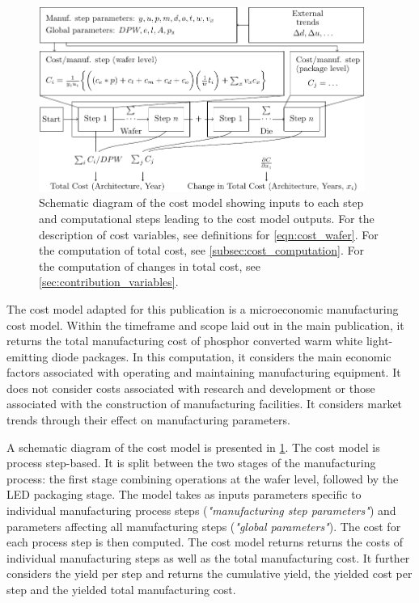 \documentclass[10pt]{article}
\begin{document}
\begin{figure}[h!]
    \centering
    \includegraphics[width=0.95\textwidth]{./figures/cost_model.pdf}
    \caption{Schematic diagram of the cost model showing inputs to each step and computational steps leading to the cost model outputs. For the description of cost variables, see definitions for \cref{eqn:cost_wafer}. For the computation of total cost, see \cref{subsec:cost_computation}. For the computation of changes in total cost, see \cref{sec:contribution_variables}.}
    \label{fig:costmodel-schematic}
\end{figure}

The cost model adapted for this publication is a microeconomic manufacturing cost model. Within the timeframe and scope laid out in the main publication, it returns the total manufacturing cost of phosphor converted warm white light-emitting diode packages. In this computation, it considers the main economic factors associated with operating and maintaining manufacturing equipment. It does not consider costs associated with research and development or those associated with the construction of manufacturing facilities. It considers market trends through their effect on manufacturing parameters.

A schematic diagram of the cost model is presented in \cref{fig:costmodel-schematic}. The cost model is process step-based. It is split between the two stages of the manufacturing process: the first stage combining operations at the wafer level, followed by the LED packaging stage. The model takes as inputs parameters specific to individual manufacturing process steps (\textit{"manufacturing step parameters"}) and parameters affecting all manufacturing steps (\textit{"global parameters"}). The cost for each process step is then computed. The cost model returns returns the costs of individual manufacturing steps as well as the total manufacturing cost. It further considers the yield per step and returns the cumulative yield, the yielded cost per step and the yielded total manufacturing cost.
\end{document}
